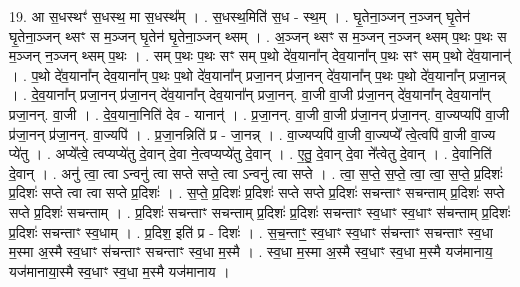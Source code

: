 \documentclass[17pt]{extarticle}
\begin{document}
19. आ स॒धस्थꣳ॑ स॒धस्थ॒ मा स॒धस्थ᳚म् । . स॒धस्थ॒मिति॑ स॒ध - स्थ॒म् । . घृ॒तेना॒ञ्जन् न॒ञ्जन् घृ॒तेन॑ घृ॒तेना॒ञ्जन् थ्सꣳ स म॒ञ्जन् घृ॒तेन॑ घृ॒तेना॒ञ्जन् थ्सम् । . अ॒ञ्जन् थ्सꣳ स म॒ञ्जन् न॒ञ्जन् थ्सम् प॒थः प॒थः स म॒ञ्जन् न॒ञ्जन् थ्सम् प॒थः । . सम् प॒थः प॒थः सꣳ सम् प॒थो दे॑व॒याना᳚न् देव॒याना᳚न् प॒थः सꣳ सम् प॒थो दे॑व॒यानान्॑ । . प॒थो दे॑व॒याना᳚न् देव॒याना᳚न् प॒थः प॒थो दे॑व॒याना᳚न् प्रजा॒नन् प्र॑जा॒नन् दे॑व॒याना᳚न् प॒थः प॒थो दे॑व॒याना᳚न् प्रजा॒नन्न् । . दे॒व॒याना᳚न् प्रजा॒नन् प्र॑जा॒नन् दे॑व॒याना᳚न् देव॒याना᳚न् प्रजा॒नन्. वा॒जी वा॒जी प्र॑जा॒नन् दे॑व॒याना᳚न् देव॒याना᳚न् प्रजा॒नन्. वा॒जी । . दे॒व॒याना॒निति॑ देव - यानान्॑ । . प्र॒जा॒नन्. वा॒जी वा॒जी प्र॑जा॒नन् प्र॑जा॒नन्. वा॒ज्यप्यपि॑ वा॒जी प्र॑जा॒नन् प्र॑जा॒नन्. वा॒ज्यपि॑ । . प्र॒जा॒नन्निति॑ प्र - जा॒नन्न् । . वा॒ज्यप्यपि॑ वा॒जी वा॒ज्यप्ये᳚ त्वे॒त्वपि॑ वा॒जी वा॒ज्य प्ये॑तु । . अप्ये᳚त्वे॒ त्वप्यप्ये॑तु दे॒वान् दे॒वा ने॒त्वप्यप्ये॑तु दे॒वान् । . ए॒तु॒ दे॒वान् दे॒वा ने᳚त्वेतु दे॒वान् । . दे॒वानिति॑ दे॒वान् । . अनु॑ त्वा॒ त्वा ऽन्वनु॑ त्वा सप्ते सप्ते॒ त्वा ऽन्वनु॑ त्वा सप्ते । . त्वा॒ स॒प्ते॒ स॒प्ते॒ त्वा॒ त्वा॒ स॒प्ते॒ प्र॒दिशः॑ प्र॒दिशः॑ सप्ते त्वा त्वा सप्ते प्र॒दिशः॑ । . स॒प्ते॒ प्र॒दिशः॑ प्र॒दिशः॑ सप्ते सप्ते प्र॒दिशः॑ सचन्ताꣳ सचन्ताम् प्र॒दिशः॑ सप्ते सप्ते प्र॒दिशः॑ सचन्ताम् । . प्र॒दिशः॑ सचन्ताꣳ सचन्ताम् प्र॒दिशः॑ प्र॒दिशः॑ सचन्ताꣳ स्व॒धाꣳ स्व॒धाꣳ स॑चन्ताम् प्र॒दिशः॑ प्र॒दिशः॑ सचन्ताꣳ स्व॒धाम् । . प्र॒दिश॒ इति॑ प्र - दिशः॑ । . स॒च॒न्ताꣳ॒॒ स्व॒धाꣳ स्व॒धाꣳ स॑चन्ताꣳ सचन्ताꣳ स्व॒धा म॒स्मा अ॒स्मै स्व॒धाꣳ स॑चन्ताꣳ सचन्ताꣳ स्व॒धा म॒स्मै । . स्व॒धा म॒स्मा अ॒स्मै स्व॒धाꣳ स्व॒धा म॒स्मै यज॑मानाय॒ यज॑मानाया॒स्मै स्व॒धाꣳ स्व॒धा म॒स्मै यज॑मानाय । \newline
\end{document}
